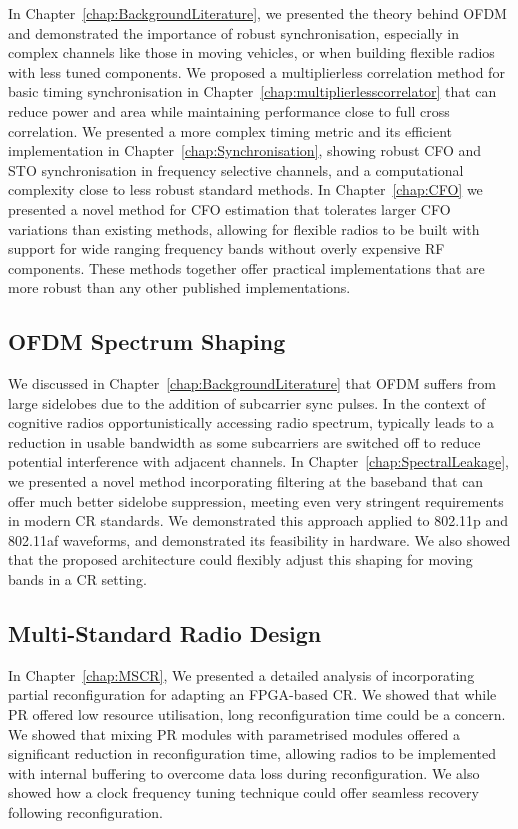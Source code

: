 In Chapter~\ref{chap:BackgroundLiterature}, we presented the theory behind OFDM and demonstrated the importance of robust synchronisation, especially in complex channels like those in moving vehicles, or when building flexible radios with less tuned components.
We proposed a multiplierless correlation method for basic timing synchronisation in Chapter~\ref{chap:multiplierlesscorrelator} that can reduce power and area while maintaining performance close to full cross correlation.
We presented a more complex timing metric and its efficient implementation in Chapter~\ref{chap:Synchronisation}, showing robust CFO and STO synchronisation in frequency selective channels, and a computational complexity close to less robust standard methods.
In Chapter~\ref{chap:CFO} we presented a novel method for CFO estimation that tolerates larger CFO variations than existing methods, allowing for flexible radios to be built with support for wide ranging frequency bands without overly expensive RF components.
These methods together offer practical implementations that are more robust than any other published implementations.

\subsection{OFDM Spectrum Shaping}
We discussed in Chapter~\ref{chap:BackgroundLiterature} that OFDM suffers from large sidelobes due to the addition of subcarrier sync pulses.
In the context of cognitive radios opportunistically accessing radio spectrum, typically leads to a reduction in usable bandwidth as some subcarriers are switched off to reduce potential interference with adjacent channels.
In Chapter~\ref{chap:SpectralLeakage}, we presented a novel method incorporating filtering at the baseband that can offer much better sidelobe suppression, meeting even very stringent requirements in modern CR standards. We demonstrated this approach applied to 802.11p and 802.11af waveforms, and demonstrated its feasibility in hardware.
We also showed that the proposed architecture could flexibly adjust this shaping for moving bands in a CR setting.

\subsection{Multi-Standard Radio Design}

In Chapter~\ref{chap:MSCR}, We presented a detailed analysis of incorporating partial reconfiguration for adapting an FPGA-based CR.
We showed that while PR offered low resource utilisation, long reconfiguration time could be a concern. We showed that mixing PR modules with parametrised modules offered a significant reduction in reconfiguration time, allowing radios to be implemented with internal buffering to overcome data loss during reconfiguration.
We also showed how a clock frequency tuning technique could offer seamless recovery following reconfiguration.

